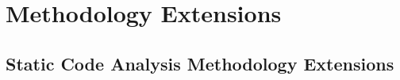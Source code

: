 \chapter{Methodology Extensions}
\label{cha:extensions}

\section{Static Code Analysis Methodology Extensions}